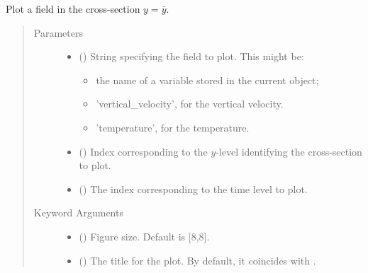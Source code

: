 \documentclass[letterpaper,10pt,english]{sphinxmanual}
\begin{document}
\begin{fulllineitems}

\begin{fulllineitems}
\label{\detokenize{api:storages.state_isentropic.StateIsentropic.contourf_xz}}
Plot a field in the cross-section \(y = \bar{y}\).
\begin{quote}\begin{description}
\item[{Parameters}] \leavevmode\begin{itemize}
\item {} 
 () \textendash{} 
String specifying the field to plot. This might be:
\begin{itemize}
\item {} 
the name of a variable stored in the current object;

\item {} 
’vertical\_velocity’, for the vertical velocity.

\item {} 
’temperature’, for the temperature.

\end{itemize}


\item {} 
 () \textendash{} Index corresponding to the \(y\)-level identifying the cross-section to plot.

\item {} 
 () \textendash{} The index corresponding to the time level to plot.

\end{itemize}

\item[{Keyword Arguments}] \leavevmode\begin{itemize}
\item {} 
 () \textendash{} Figure size. Default is {[}8,8{]}.

\item {} 
 () \textendash{} The title for the plot. By default, it coincides with .


\end{itemize}
\end{description}
\end{quote}
\end{fulllineitems}
\end{fulllineitems}
\end{document}
